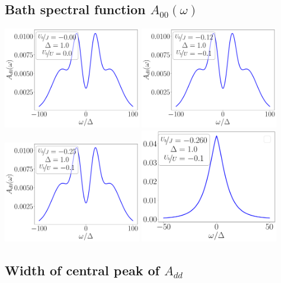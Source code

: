 \documentclass{report}
\numberwithin{equation}{section}
\begin{document}
\subsection{Bath spectral function \(A_{00}(\omega)\)}
\begin{center}
	\includegraphics[width=0.45\textwidth]{../figures/spec_func_00_Ub_by_J=-0.000.pdf}
	\includegraphics[width=0.45\textwidth]{../figures/spec_func_00_Ub_by_J=-0.125.pdf}
	\includegraphics[width=0.45\textwidth]{../figures/spec_func_00_Ub_by_J=-0.250.pdf}
	\includegraphics[width=0.45\textwidth]{../figures/spec_func_00_Ub_by_J=-0.26.pdf}
\end{center}

\subsection{Width of central peak of \(A_{dd}\)}
\end{document}

